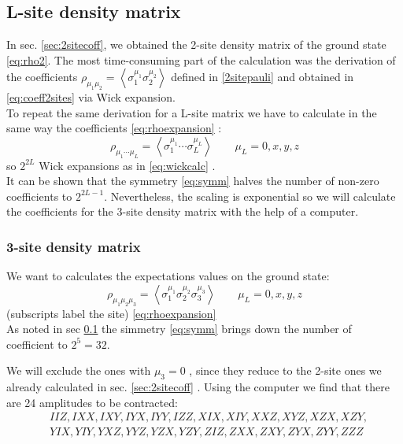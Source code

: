 \documentclass[10pt,a4paper]{article}
\begin{document}
\subsection{L-site density matrix}\label{sec:L-site}
In sec. \ref{sec:2sitecoff}, we obtained the 2-site density matrix of the ground state \ref{eq:rho2}. The most time-consuming part of the calculation was the derivation of the coefficients 	$\rho_{\mu_{1}  \mu_{2}}=\left\langle\sigma_{1}^{\mu_{1}}  \sigma_{2}^{\mu_{2}}\right\rangle$ defined in \ref{2sitepauli} 
and obtained in \ref{eq:coeff2sites} via Wick expansion.\\
To repeat the same derivation for a L-site matrix we have to calculate in the same way the coefficients \ref{eq:rhoexpansion} :
\begin{equation}\rho_{\mu_{1}\cdots  \mu_{L}}=\left\langle\sigma_{1}^{\mu_{1}}\cdots  \sigma_{L}^{\mu_{L}}\right\rangle  \qquad \mu_{L}=0, x, y, z\end{equation}
so $2^{2L}$ Wick expansions as in \ref{eq:wickcalc} .\\
It can be shown that the symmetry \ref{eq:symm} halves the number of non-zero coefficients to $2^{2L-1}$.
Nevertheless, the scaling is exponential so we will calculate the coefficients for the 3-site density matrix with the help of a computer.
\subsubsection{3-site density matrix}
We want  to calculates the expectations values on the ground state:
\begin{equation}\rho_{\mu_{1}\mu_2  \mu_{3}}=\left\langle\sigma_{1}^{\mu_{1}}\sigma_{2}^{\mu_{2}} \sigma_{3}^{\mu_{3}}\right\rangle  \qquad \mu_{L}=0, x, y, z\end{equation}
(subscripts label the site) \ref{eq:rhoexpansion} \\
As noted in sec \ref{sec:L-site} the simmetry \ref{eq:symm} brings down the number of coefficient to $2^{5}=32$.

We will exclude the ones with $\mu_{3}=0$ , since they reduce to the 2-site ones  we already calculated in sec. \ref{sec:2sitecoff} . 
Using the computer we find that there are 24 amplitudes to be contracted:\\
\begin{equation}\label{eq:3-sitecoeff}
\begin{aligned}
&IIZ, IXX, IXY, IYX, IYY, IZZ, XIX, XIY, XXZ, XYZ, XZX, XZY, \\&  YIX, YIY, YXZ, YYZ, YZX, YZY, ZIZ, ZXX, ZXY, ZYX, ZYY, ZZZ
\end{aligned}
\end{equation}
\end{document}
